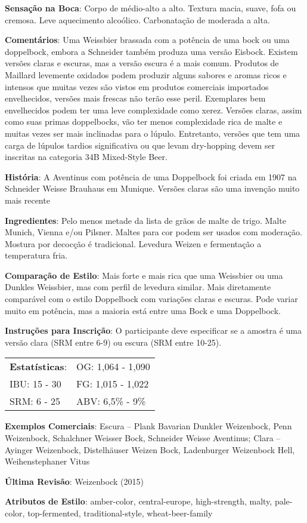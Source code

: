 \textbf{Sensação na Boca}: Corpo de médio-alto a alto. Textura macia, suave, fofa ou cremosa. Leve aquecimento alcoólico. Carbonatação de moderada a alta.

\textbf{Comentários}: Uma Weissbier brassada com a potência de uma bock ou uma doppelbock, embora a Schneider também produza uma versão Eisbock. Existem versões claras e escuras, mas a versão escura é a mais comum. Produtos de Maillard levemente oxidados podem produzir alguns sabores e aromas ricos e intensos que muitas vezes são vistos em produtos comerciais importados envelhecidos, versões mais frescas não terão esse peril. Exemplares bem envelhecidos podem ter uma leve complexidade como xerez. Versões claras, assim como suas primas doppelbocks, vão ter menos complexidade rica de malte e muitas vezes ser mais inclinadas para o lúpulo. Entretanto, versões que tem uma carga de lúpulos tardios significativa ou que levam dry-hopping devem ser inscritas na categoria 34B Mixed-Style Beer.

\textbf{História}: A Aventinus com potência de uma Doppelbock foi criada em 1907 na Schneider Weisse Brauhaus em Munique. Versões claras são uma invenção muito mais recente

\textbf{Ingredientes}: Pelo menos metade da lista de grãos de malte de trigo. Malte Munich, Vienna e/ou Pilsner. Maltes para cor podem ser usados com moderação. Mostura por decocção é tradicional. Levedura Weizen e fermentação a temperatura fria.

\textbf{Comparação de Estilo}: Mais forte e mais rica que uma Weissbier ou uma Dunkles Weissbier, mas com perfil de levedura similar. Mais diretamente comparável com o estilo Doppelbock com variações claras e escuras. Pode variar muito em potência, mas a maioria está entre uma Bock e uma Doppelbock.

\textbf{Instruções para Inscrição}: O participante deve especificar se a amostra é uma versão clara (SRM entre 6-9) ou escura (SRM entre 10-25).

\begin{tabular}{@{}p{35mm}p{35mm}@{}}
  \textbf{Estatísticas}: & OG: 1,064 - 1,090 \\
  IBU: 15 - 30 & FG: 1,015 - 1,022 \\
  SRM: 6 - 25 & ABV: 6,5\% - 9\%
\end{tabular}

\textbf{Exemplos Comerciais}: Escura – Plank Bavarian Dunkler Weizenbock, Penn Weizenbock, Schalchner Weisser Bock, Schneider Weisse Aventinus; Clara – Ayinger Weizenbock, Distelhäuser Weizen Bock, Ladenburger Weizenbock Hell, Weihenstephaner Vitus

\textbf{Última Revisão}: Weizenbock (2015)

\textbf{Atributos de Estilo}: amber-color, central-europe, high-strength, malty, pale-color, top-fermented, traditional-style, wheat-beer-family
